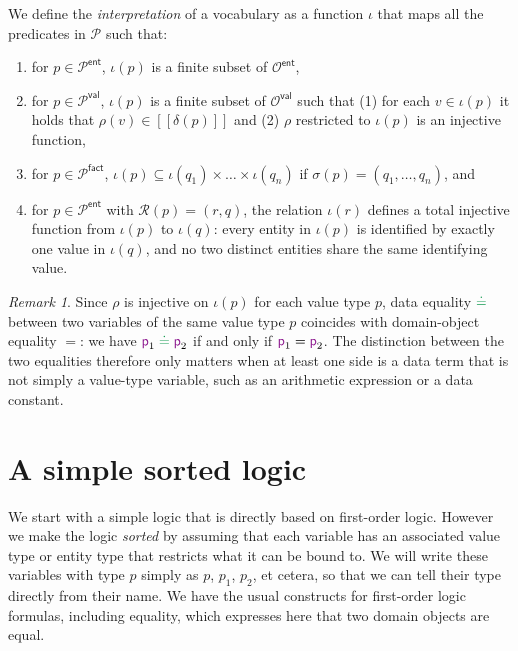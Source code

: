 \documentclass[11pt]{amsart}
\theoremstyle{definition}
\theoremstyle{remark}
\newtheorem{remark}[theorem]{Remark}
\newcommand{\DomValues}{\mathcal{O}^{\mathsf{val}}}
\newcommand{\DomEnts}{\mathcal{O}^{\mathsf{ent}}}
\newcommand{\Preds}{\mathcal{P}}
\newcommand{\EntPreds}{\Preds^{\textsf{ent}}}
\newcommand{\ValPreds}{\Preds^{\textsf{val}}}
\newcommand{\FactPreds}{\Preds^{\textsf{fact}}}
\newcommand{\RefSchemes}{\mathcal{R}}
\newcommand{\sem}[1]{[\![{#1}]\!]}
\newcommand{\var}[1]{\mathsf{\textcolor{Plum}{#1}}}
\newcommand{\dataEq}{\mathrel{\textcolor{ForestGreen}{\doteq}}}
\begin{document}
We define the \emph{interpretation} of a vocabulary as a function $\iota$ that maps all the predicates in $\Preds$ such that:
\begin{enumerate}
  \item for $p \in \EntPreds$, $\iota(p)$ is a finite subset of $\DomEnts$,
  \item for $p \in \ValPreds$, $\iota(p)$ is a finite subset of $\DomValues$ such that (1) for each $v \in \iota(p)$ it holds that $\rho(v) \in \sem{\delta(p)}$ and (2) $\rho$ restricted to $\iota(p)$ is an injective function,
  \item for $p \in \FactPreds$, $\iota(p) \subseteq \iota(q_1) \times \ldots \times \iota(q_n)$ if $\sigma(p) = (q_1, \ldots, q_n)$, and
  \item for $p \in \EntPreds$ with $\RefSchemes(p) = (r, q)$, the relation $\iota(r)$ defines a total injective function from $\iota(p)$ to $\iota(q)$: every entity in $\iota(p)$ is identified by exactly one value in $\iota(q)$, and no two distinct entities share the same identifying value.
\end{enumerate}

\begin{remark}
Since $\rho$ is injective on $\iota(p)$ for each value type $p$, data
equality $\dataEq$ between two variables of the same value type $p$
coincides with domain-object equality $=$: we have
$\var{p}_1 \dataEq \var{p}_2$ if and only if $\var{p}_1 = \var{p}_2$.
The distinction between the two equalities therefore only matters when at
least one side is a data term that is not simply a value-type variable,
such as an arithmetic expression or a data constant.
\end{remark}

\section{A simple sorted logic}

We start with a simple logic that is directly based on first-order logic. However we make the logic \emph{sorted} by assuming that each variable has an associated value type or entity type that restricts what it can be bound to. We will write these variables with type $p$ simply as $p$, $p_1$, $p_2$, et cetera, so that we can tell their type directly from their name. We have the usual constructs for first-order logic formulas, including equality, which expresses here that two domain objects are equal.
\end{document}
